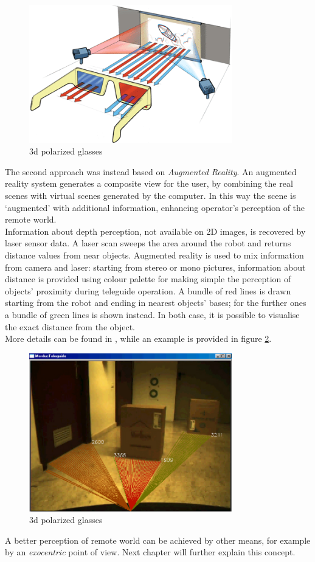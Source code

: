 \begin{figure}
  \begin{center}
    \includegraphics[width=250pt]{img/3d-glasses.png}
    \caption{3d polarized glasses}
    \label{fig:3d-glasses}
  \end{center}
\end{figure}

The second approach was instead based on \textit{Augmented Reality}.
An augmented reality system generates a composite view for the user,
by combining the real scenes with virtual scenes generated by the
computer. In this way the scene is `augmented' with additional
information, enhancing operator's perception of the remote world.
\\
Information about depth perception, not available on
2D images, is recovered by laser sensor data. A laser scan sweeps the area
around the robot and returns distance values from near objects. Augmented
reality is used to mix information from camera and laser: starting from
stereo or mono pictures, information about distance is provided using colour
palette for making simple the perception of objects' proximity during
teleguide operation. A bundle of red lines is drawn starting from the robot
and ending in nearest objects' bases; for the further ones a bundle of green
lines is shown instead. In both case, it is possible to visualise the
exact distance from the object.
\\
More details can be found in \cite{morduc:macalusodetommaso}, while an
example is provided in figure \ref{fig:augmented_morduc}.

\begin{figure}
  \begin{center}
    \includegraphics[width=250pt]{img/augmented_morduc.png}
    \caption{3d polarized glasses}
    \label{fig:augmented_morduc}
  \end{center}
\end{figure}

A better perception of remote world can be achieved by other means,
for example by an \textit{exocentric} point of view. Next chapter will
further explain this concept.
